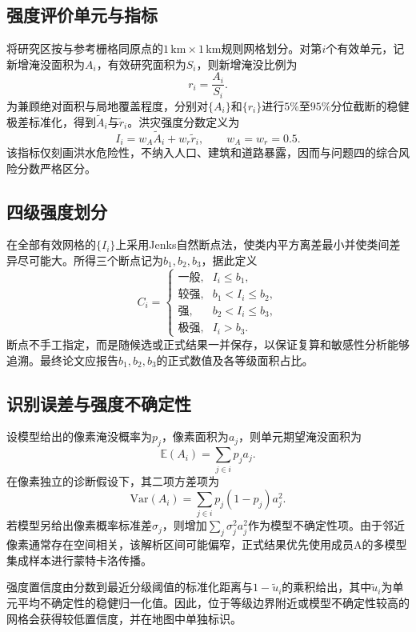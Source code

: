 
\subsection{强度评价单元与指标}
\label{sec:q2-intensity}

将研究区按与参考栅格同原点的$1\,\mathrm{km}\times1\,\mathrm{km}$规则网格划分。对第$i$个有效单元，记新增淹没面积为$A_i$，有效研究面积为$S_i$，则新增淹没比例为
\begin{equation}
 r_i=\frac{A_i}{S_i}.
\end{equation}
为兼顾绝对面积与局地覆盖程度，分别对$\{A_i\}$和$\{r_i\}$进行$5\%$至$95\%$分位截断的稳健极差标准化，得到$\widetilde A_i$与$\widetilde r_i$。洪灾强度分数定义为
\begin{equation}
 I_i=w_A\widetilde A_i+w_r\widetilde r_i,\qquad
 w_A=w_r=0.5.
\end{equation}
该指标仅刻画洪水危险性，不纳入人口、建筑和道路暴露，因而与问题四的综合风险分数严格区分。

\subsection{四级强度划分}

在全部有效网格的$\{I_i\}$上采用Jenks自然断点法，使类内平方离差最小并使类间差异尽可能大。所得三个断点记为$b_1,b_2,b_3$，据此定义
\begin{equation}
 C_i=
 \begin{cases}
 \text{一般}, & I_i\le b_1,\\
 \text{较强}, & b_1<I_i\le b_2,\\
 \text{强}, & b_2<I_i\le b_3,\\
 \text{极强}, & I_i>b_3.
 \end{cases}
\end{equation}
断点不手工指定，而是随候选或正式结果一并保存，以保证复算和敏感性分析能够追溯。最终论文应报告$b_1,b_2,b_3$的正式数值及各等级面积占比。

\subsection{识别误差与强度不确定性}

设模型给出的像素淹没概率为$p_j$，像素面积为$a_j$，则单元期望淹没面积为
\begin{equation}
 \mathbb E(A_i)=\sum_{j\in i}p_ja_j.
\end{equation}
在像素独立的诊断假设下，其二项方差项为
\begin{equation}
 \mathrm{Var}(A_i)=\sum_{j\in i}p_j(1-p_j)a_j^2.
\end{equation}
若模型另给出像素概率标准差$\sigma_j$，则增加$\sum_j\sigma_j^2a_j^2$作为模型不确定性项。由于邻近像素通常存在空间相关，该解析区间可能偏窄，正式结果优先使用成员A的多模型集成样本进行蒙特卡洛传播。

强度置信度由分数到最近分级阈值的标准化距离与$1-\widetilde u_i$的乘积给出，其中$\widetilde u_i$为单元平均不确定性的稳健归一化值。因此，位于等级边界附近或模型不确定性较高的网格会获得较低置信度，并在地图中单独标识。
